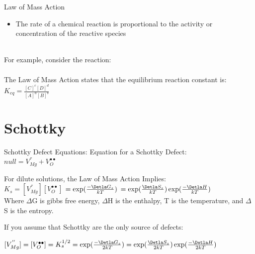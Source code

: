 \documentclass{libs/XJTLU_format}
\begin{document}
\begin{frame}{Law of Mass Action}
\begin{itemize}
    \item The rate of a chemical reaction is proportional to the activity or concentration of the reactive species
\end{itemize}\\[6 pt]

\pause
For example, consider the reaction: \\[3 pt]

\\[6 pt]

\pause
The Law of Mass Action states that the equilibrium reaction constant is: \\[3 pt]

\centering
$K_{eq} = \frac{[C]^c[D]^d}{[A]^a[B]^b}$
    
\end{frame}

\section{Schottky}
\begin{frame}{Schottky Defect Equations:}
Equation for a Schottky Defect: \\[0.1cm]
\centering
$null = V_{Mg}^{''} + V_{O}^{\bullet \bullet}$\\[0.3cm] \pause

\justifying
For dilute solutions, the Law of Mass Action Implies:\\[0.1cm]
\centering
$K_s = [V_{Mg}^{''}][V_{O}^{\bullet \bullet}]$ \pause $= \exp(\frac{-\Detla G_s}{kT})$ \pause $= \exp(\frac{\Detla S_s}{kT}) \exp(\frac{-\Detla H}{kT})$\\[0.1cm]

\justifying
Where $\Delta$G is gibbs free energy, $\Delta$H is the enthalpy, T is the temperature, and $\Delta$S is the entropy.\\[0.3cm] \pause

\justifying
If you assume that Schottky are the only source of defects:

\centering
$[V_{Mg}^{''}] = [V_{O}^{\bullet \bullet}] = K_s^{1/2} = \exp(\frac{-\Detla G_s}{2kT}) = \exp(\frac{\Detla S_s}{2kT})\exp(\frac{-\Detla H}{2kT})$
    
\end{frame}
\end{document}
